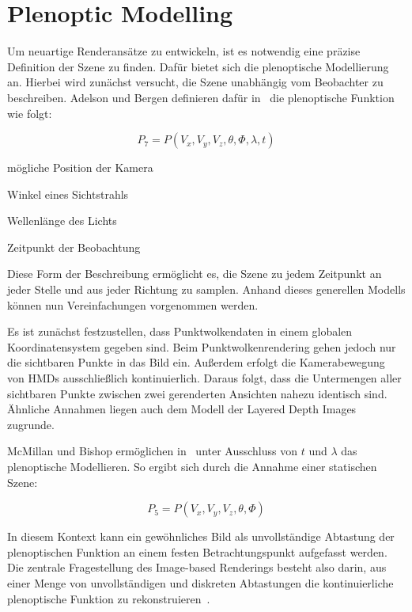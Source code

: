 \documentclass[hyperref, beleg, german]{cgvpub}
\begin{document}
\section{Plenoptic Modelling}

Um neuartige Renderansätze zu entwickeln, ist es notwendig eine präzise
Definition der Szene zu finden. Dafür bietet sich die plenoptische Modellierung
an. Hierbei wird zunächst versucht, die Szene unabhängig vom Beobachter zu
beschreiben. Adelson und Bergen definieren dafür in~\cite{adelson1991plenoptic}
die plenoptische Funktion wie folgt:

\begin{equation}
	P_7 = P(V_x, V_y, V_z, \theta, \Phi, \lambda, t)
\end{equation}

\begin{description}[style=sameline]
	\item[\( V_x, V_y, V_z \)] mögliche Position der Kamera
	\item[\( \theta, \Phi \)] Winkel eines Sichtstrahls
	\item[\( \lambda \)] Wellenlänge des Lichts
	\item[\( t \)] Zeitpunkt der Beobachtung
\end{description}

Diese Form der Beschreibung ermöglicht es, die Szene zu jedem Zeitpunkt an
jeder Stelle und aus jeder Richtung zu samplen. Anhand dieses generellen
Modells können nun Vereinfachungen vorgenommen werden.

Es ist zunächst festzustellen, dass Punktwolkendaten in einem globalen
Koordinatensystem gegeben sind. Beim Punktwolkenrendering gehen jedoch nur die
sichtbaren Punkte in das Bild ein. Außerdem erfolgt die Kamerabewegung von HMDs
ausschließlich kontinuierlich. Daraus folgt, dass die Untermengen aller
sichtbaren Punkte zwischen zwei gerenderten Ansichten nahezu identisch sind.
Ähnliche Annahmen liegen auch dem Modell der Layered Depth Images zugrunde.

McMillan und Bishop ermöglichen in~\cite{mcmillan1995plenoptic} unter
Ausschluss von \( t \) und \( \lambda \) das plenoptische Modellieren. So
ergibt sich durch die Annahme einer statischen Szene:

\begin{equation}
	P_5 = P(V_x, V_y, V_z, \theta, \Phi)
\end{equation}

In diesem Kontext kann ein gewöhnliches Bild als unvollständige Abtastung der
plenoptischen Funktion an einem festen Betrachtungspunkt aufgefasst werden. Die
zentrale Fragestellung des Image-based Renderings besteht also darin, aus einer
Menge von unvollständigen und diskreten Abtastungen die kontinuierliche
plenoptische Funktion zu rekonstruieren~\cite{mcmillan1995plenoptic}.
\end{document}
